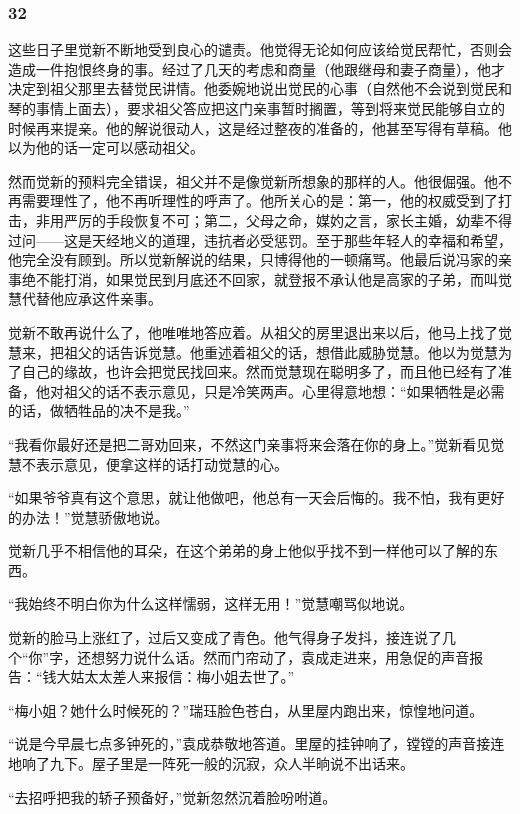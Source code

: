 \subsubsection*{32}

\par 这些日子里觉新不断地受到良心的谴责。他觉得无论如何应该给觉民帮忙，否则会造成一件抱恨终身的事。经过了几天的考虑和商量（他跟继母和妻子商量），他才决定到祖父那里去替觉民讲情。他委婉地说出觉民的心事（自然他不会说到觉民和琴的事情上面去），要求祖父答应把这门亲事暂时搁置，等到将来觉民能够自立的时候再来提亲。他的解说很动人，这是经过整夜的准备的，他甚至写得有草稿。他以为他的话一定可以感动祖父。
\par 然而觉新的预料完全错误，祖父并不是像觉新所想象的那样的人。他很倔强。他不再需要理性了，他不再听理性的呼声了。他所关心的是：第一，他的权威受到了打击，非用严厉的手段恢复不可；第二，父母之命，媒妁之言，家长主婚，幼辈不得过问——这是天经地义的道理，违抗者必受惩罚。至于那些年轻人的幸福和希望，他完全没有顾到。所以觉新解说的结果，只博得他的一顿痛骂。他最后说冯家的亲事绝不能打消，如果觉民到月底还不回家，就登报不承认他是高家的子弟，而叫觉慧代替他应承这件亲事。
\par 觉新不敢再说什么了，他唯唯地答应着。从祖父的房里退出来以后，他马上找了觉慧来，把祖父的话告诉觉慧。他重述着祖父的话，想借此威胁觉慧。他以为觉慧为了自己的缘故，也许会把觉民找回来。然而觉慧现在聪明多了，而且他已经有了准备，他对祖父的话不表示意见，只是冷笑两声。心里得意地想：“如果牺牲是必需的话，做牺牲品的决不是我。”
\par “我看你最好还是把二哥劝回来，不然这门亲事将来会落在你的身上。”觉新看见觉慧不表示意见，便拿这样的话打动觉慧的心。
\par “如果爷爷真有这个意思，就让他做吧，他总有一天会后悔的。我不怕，我有更好的办法！”觉慧骄傲地说。
\par 觉新几乎不相信他的耳朵，在这个弟弟的身上他似乎找不到一样他可以了解的东西。
\par “我始终不明白你为什么这样懦弱，这样无用！”觉慧嘲骂似地说。
\par 觉新的脸马上涨红了，过后又变成了青色。他气得身子发抖，接连说了几个“你”字，还想努力说什么话。然而门帘动了，袁成走进来，用急促的声音报告：“钱大姑太太差人来报信：梅小姐去世了。”
\par “梅小姐？她什么时候死的？”瑞珏脸色苍白，从里屋内跑出来，惊惶地问道。
\par “说是今早晨七点多钟死的，”袁成恭敬地答道。里屋的挂钟响了，镗镗的声音接连地响了九下。屋子里是一阵死一般的沉寂，众人半晌说不出话来。
\par “去招呼把我的轿子预备好，”觉新忽然沉着脸吩咐道。
